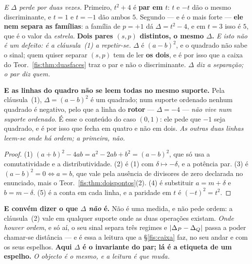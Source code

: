 \documentclass[livro.tex]{subfiles}
\begin{document}
\begin{corolario}
\begin{enumerate}
\smallskip
\emph{E $\Delta$ perde por duas vezes.} Primeiro, $t^{2}+4$ é \textbf{par em
$t$}: $t$ e $-t$ dão o mesmo discriminante, e $t=1$ e $t=-1$ dão ambos $5$.
Segundo --- e é o mais forte --- \textbf{ele nem separa as famílias}: a família
de $p=+1$ dá $\Delta=t^{2}-4$, e em $t=3$ isso é $5$, que é o valor da
\emph{estrela}. \textbf{Dois pares $(s,p)$ distintos, o mesmo $\Delta$.}
\smallskip
\emph{E isto não é um defeito: é a cláusula~(1) a repetir-se.} $\Delta$ é
$(a-b)^{2}$, e o quadrado não sabe o sinal; quem quiser separar $(s,p)$ tem de
ler \textbf{os dois}, e é por isso que a caixa do Teor.~\ref{fis:thm:duasfaces}
traz o par e não o discriminante. \emph{$\Delta$ diz a separação; o par diz quem.}
\end{enumerate}
\smallskip\noindent\textbf{E as linhas do quadro não se leem todas no mesmo
suporte.} Pela cláusula~(1), $\Delta=(a-b)^{2}$ é um quadrado; num suporte
ordenado nenhum quadrado é negativo, pelo que a linha do \textbf{rotor} ---
$\Delta=-4$ --- \emph{não vive num suporte ordenado}. É esse o conteúdo do caso
$(0,1)$: ele pede que $-1$ seja quadrado, e é por isso que fecha em quatro e não
em dois. \emph{As outras duas linhas leem-se onde há ordem; a primeira, não.}
\end{corolario}

\begin{proof}
(1) $(a+b)^{2}-4ab=a^{2}-2ab+b^{2}=(a-b)^{2}$, que só usa a comutatividade e a
distributividade. (2) é (1) com $\delta\mapsto-\delta$, e a potência par. (3) é
$(a-b)^{2}=0\iff a=b$, que vale pela ausência de divisores de zero declarada no
enunciado, mais o Teor.~\ref{fis:thm:doispontos}(2). (4) é substituir
$a=m+\delta$ e $b=m-\delta$. (5) é a conta em cada linha, e a paridade em $t$ é
$(-t)^{2}=t^{2}$.
\end{proof}

\medskip\noindent\textbf{E convém dizer o que $\Delta$ \emph{não} é.} Não é uma
medida, e não pede ordem: a cláusula~(2) vale em qualquer suporte onde as duas
operações existam. \emph{Onde houver ordem}, e só aí, o seu sinal separa três
regimes e $\lvert \Delta_P-\Delta_Q\rvert$ passa a poder chamar-se distância --- e é
essa a leitura que a §\ref{fis:caixa} faz, no seu andar e com os seus espelhos.
\textbf{Aqui $\Delta$ é o invariante do par; lá é a etiqueta de um espelho.}
\emph{O objecto é o mesmo, e a leitura é que muda.}
\end{document}
